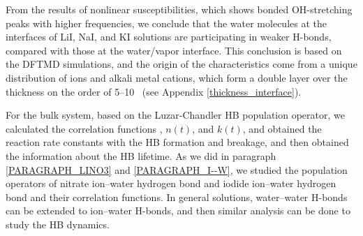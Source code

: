 From the results of nonlinear susceptibilities, which shows bonded OH-stretching peaks with higher frequencies, 
we conclude that the water molecules at the interfaces of LiI, NaI, and KI solutions are participating 
in weaker H-bonds, compared with those at the water/vapor interface. 
This conclusion is based on the DFTMD simulations, and %
the origin of the characteristics come from a unique distribution of \I ions and alkali metal cations, 
which form a double layer \cite{Shultz2010} over the thickness on the order of 5--10 \A\ (see Appendix \ref{thickness_interface}).

For the bulk system, based on the Luzar-Chandler HB population operator, 
we calculated the correlation functions \CHB, $n(t)$, and $k(t)$, and obtained the reaction rate constants with the HB formation and breakage, 
and then obtained the information about the HB lifetime. 
As we did in paragraph \ref{PARAGRAPH_LINO3} and \ref{PARAGRAPH_I--W}, we studied the population operators of nitrate ion--water hydrogen bond 
and iodide ion--water hydrogen bond and their correlation functions. In general solutions, water--water H-bonds can be extended to ion--water H-bonds, 
and then similar analysis can be done to study the HB dynamics.

